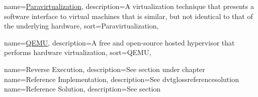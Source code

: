 \newcommand{\dvttermnasa}{NASA}
\newcommand{\dvttermnortel}{Nortel Networks Corporation}
\newcommand{\dvttermnorthropgrumman}{Northrop Grumman Corporation}

\newcommand{\dvttermopengl}{OpenGL}
\newcommand{\dvttermopengles}{\dvttermopengl ~ES}
\newcommand{\dvttermopenglestwopointo}{\dvttermopengles ~\dvtcmdnum{2.0}}
\newcommand{\dvttermos}{\dvtcmdabbrev{dvtglossos}}

\newcommand{\dvttermpci}{\dvtcmdabbrev{dvtglosspci}}
\newcommand{\dvttermpcipassthrough}{\dvttermpci\ passthrough}
{
  name=\href{http://en.wikipedia.org/wiki/Paravirtualization}{Paravirtualization},
  description={A virtualization technique that presents a software interface to virtual machines that is similar, but not identical to that of the underlying hardware},
  sort={Paravirtualization},
}
\newcommand{\dvttermparavirtualization}{\dvtcmdcaponcegloss{dvtglossparavirtualization}{Paravirtualization}}
\newcommand{\dvttermpython}{\texttt{Python}}

{
  name=\href{http://en.wikipedia.org/wiki/QEMU}{QEMU},
  description={A free and open-source hosted hypervisor that performs hardware virtualization},
  sort={QEMU},
}
\newcommand{\dvttermqemu}{\glslink{dvtglossqemu}{QEMU}} %

{
  name=Reverse Execution,
  description={See section  under chapter }
}
\newcommand{\dvttermreverseexecution}{\dvtcmdcaponcegloss{dvtglossreverseexecution}{Reverse Execution}}
{
  name=Reference Implementation,
  description={See \gls{dvtglossreferencesolution}}
}
\newcommand{\dvttermreferenceimplementation}{\dvtcmdcaponcegloss{dvtglossreferenceimplementation}{Reference Implementation}}
{
  name=Reference Solution,
  description={See section }
}
\newcommand{\dvttermreferencesolution}{\dvtcmdcaponcegloss{dvtglossreferencesolution}{Reference Solution}}

